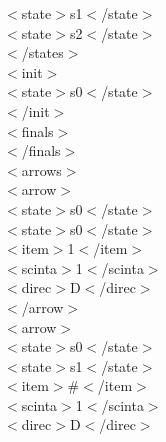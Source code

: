 \documentclass[12pt,a4paper,spanish]{book}
\begin{document}
{\indent \indent $<$state$>$s1$<$/state$>$\\

\indent \indent $<$state$>$s2$<$/state$>$\\

\indent $<$/states$>$\\

\indent $<$init$>$\\

\indent \indent $<$state$>$s0$<$/state$>$\\

\indent $<$/init$>$\\

\indent $<$finals$>$\\

\indent $<$/finals$>$\\

\indent $<$arrows$>$\\

\indent \indent $<$arrow$>$\\

\indent \indent \indent $<$state$>$s0$<$/state$>$\\

\indent \indent \indent $<$state$>$s0$<$/state$>$\\

\indent \indent \indent $<$item$>$1$<$/item$>$\\

\indent \indent \indent $<$scinta$>$1$<$/scinta$>$\\

\indent \indent \indent $<$direc$>$D$<$/direc$>$\\

\indent \indent $<$/arrow$>$\\

\indent \indent $<$arrow$>$\\

\indent \indent \indent $<$state$>$s0$<$/state$>$\\

\indent \indent \indent$<$state$>$s1$<$/state$>$\\

\indent \indent \indent $<$item$>$\#$<$/item$>$\\

\indent \indent \indent $<$scinta$>$1$<$/scinta$>$\\

\indent \indent \indent$<$direc$>$D$<$/direc$>$\\

}
\end{document}
